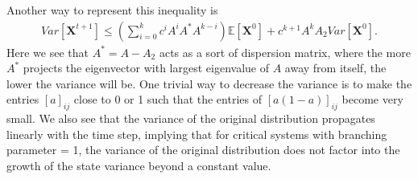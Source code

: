 \documentclass[superscriptaddress]{revtex4-1}
\begin{document}
Another way to represent this inequality is
\begin{align*}
Var[\bm{X}^{t+1}] \leq \left(\sum_{i=0}^k c^i A^i A^*A^{k-i}\right) \mathbb{E}[\bm{X}^0] + c^{k+1}A^kA_2Var[\bm{X}^0].
\end{align*}
Here we see that $A^* = A-A_2$ acts as a sort of dispersion matrix, where the more $A^*$ projects the eigenvector with largest eigenvalue of $A$ away from itself, the lower the variance will be. One trivial way to decrease the variance is to make the entries $[a]_{ij}$ close to 0 or 1 such that the entries of $[a(1-a)]_{ij}$ become very small. We also see that the variance of the original distribution propagates linearly with the time step, implying that for critical systems with branching parameter = 1, the variance of the original distribution does not factor into the growth of the state variance beyond a constant value. 
\end{document}
